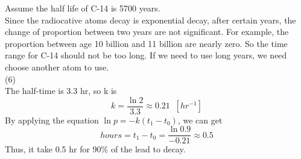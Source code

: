 \documentclass [24pt] {article}
\begin{document}
	Assume the half life of C-14 is 5700 years.\\
	Since the radiocative atoms decay is exponential decay, after certain years, the change of proportion between two years are not significant. For example, the proportion between age 10 billion and 11 billion are nearly zero. So the time range for C-14 should not be too long. If we need to use long years, we need choose another atom to use.
	\vspace {16pt}
	\\(6)\\
	The half-time is 3.3 hr, so k is
	\[k = \frac {\ln 2}{3.3} \approx 0.21 \;\;[hr^{-1}]\]
	By applying the equation $\ln p = -k (t_1 - t_0)$, we can get
	\[hours = t_{1}-t_{0} = \frac{\ln 0.9}{-0.21} \approx 0.5\]
	Thus, it take 0.5 hr for 90\% of the lead to decay.
\end{document}
